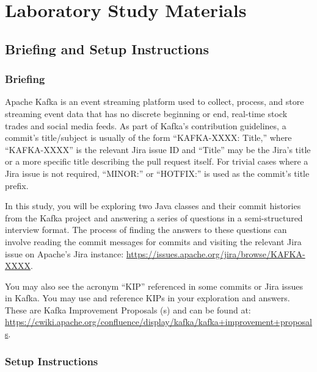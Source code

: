 \chapter{Laboratory Study Materials}


\section{Briefing and Setup Instructions}
\label{sec:Briefing-and-Setup}

\subsection{Briefing}
\label{subsec:Briefing}

Apache Kafka is an event streaming platform used to collect, process, and store streaming event data that has no discrete beginning or end, \eg real-time stock trades and social media feeds. 
As part of Kafka’s contribution guidelines, a commit’s title/subject is usually of the form ``KAFKA-XXXX: Title,'' where ``KAFKA-XXXX'' is the relevant Jira issue ID and ``Title'' may be the Jira’s title or a more specific title describing the pull request itself. 
For trivial cases where a Jira issue is not required, ``MINOR:'' or ``HOTFIX:'' is used as the commit’s title prefix.

In this study, you will be exploring two Java classes and their commit histories from the Kafka project and answering a series of questions in a semi-structured interview format. The process of finding the answers to these questions can involve reading the commit messages for commits and visiting the relevant Jira issue on Apache’s Jira instance:
\url{https://issues.apache.org/jira/browse/KAFKA-XXXX}.

You may also see the acronym ``KIP'' referenced in some commits or Jira issues in Kafka. You may use and reference KIPs in your exploration and answers. These are Kafka Improvement Proposals (s) and can be found at: 
\url{https://cwiki.apache.org/confluence/display/kafka/kafka+improvement+proposals}.

\subsection{Setup Instructions}
\label{sec:Setup-Instructions}


